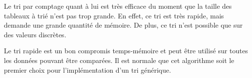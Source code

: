 \documentclass[11pt]{article}
\begin{document}
Le tri par comptage quant à lui est très efficace du moment que la taille des tableaux à trié n'est pas trop grande. En effet, ce tri est très rapide, mais demande une grande quantité de mémoire. De plus, ce tri n'est possible que sur des valeurs discrètes.

Le tri rapide est un bon compromis temps-mémoire et peut être utilisé sur toutes les données pouvant être comparées. Il est normale que cet algorithme soit le premier choix pour l'implémentation d'un tri générique. 



\end{document}

